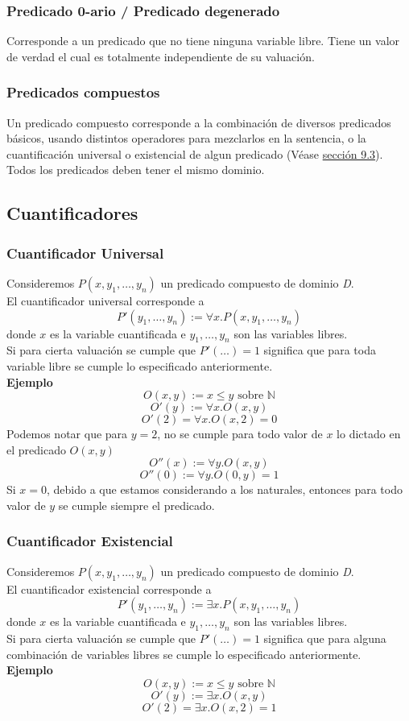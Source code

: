 \documentclass{article}
\begin{document}
\subsubsection{Predicado 0-ario / Predicado degenerado}
Corresponde a un predicado que no tiene ninguna variable libre. Tiene un valor de verdad el cual es totalmente independiente de su valuación.

\subsubsection{Predicados compuestos}
Un predicado compuesto corresponde a la combinación de diversos predicados básicos, usando distintos operadores para mezclarlos en la sentencia, o la cuantificación universal o existencial de algun predicado (Véase \hyperref[sec:cuantificadores]{sección 9.3}). Todos los predicados deben tener el mismo dominio.

\subsection{Cuantificadores}
\label{sec:cuantificadores}
\subsubsection{Cuantificador Universal}
Consideremos $P(x, y_{1}, \ldots{}, y_{n})$ un predicado compuesto de dominio \textit{D}.\\
El cuantificador universal corresponde a
$$P'(y_{1}, \ldots{}, y_{n}) := \forall{} x . P(x, y_{1}, \ldots{}, y_{n})$$
donde $x$ es la variable cuantificada e $y_{1}, \ldots{}, y_{n}$ son las variables libres.\\
Si para cierta valuación se cumple que $P'(\ldots{}) = 1$ significa que para toda variable libre se cumple lo especificado anteriormente.\\
\textbf{Ejemplo}
$$O(x,y) := x \leq y \text{ sobre } \mathds{N}$$
$$O'(y) := \forall x . O(x,y)$$
$$O'(2) = \forall x. O(x,2) = 0$$
Podemos notar que para $y = 2$, no se cumple para todo valor de $x$ lo dictado en el predicado $O(x,y)$
$$O''(x) := \forall y . O(x,y)$$
$$O''(0) := \forall y . O(0,y) = 1$$
Si $x = 0$, debido a que estamos considerando a los naturales, entonces para todo valor de $y$ se cumple siempre el predicado.

\subsubsection{Cuantificador Existencial}
Consideremos $P(x, y_{1}, \ldots{}, y_{n})$ un predicado compuesto de dominio \textit{D}.\\
El cuantificador existencial corresponde a
$$P'(y_{1}, \ldots{}, y_{n}) := \exists x . P(x, y_{1}, \ldots{}, y_{n})$$
donde $x$ es la variable cuantificada e $y_{1}, \ldots{}, y_{n}$ son las variables libres.\\
Si para cierta valuación se cumple que $P'(\ldots{}) = 1$ significa que para alguna combinación de variables libres se cumple lo especificado anteriormente.\\
\textbf{Ejemplo}
$$O(x,y) := x \leq y \text{ sobre } \mathds{N}$$
$$O'(y) := \exists x . O(x,y)$$
$$O'(2) = \exists x. O(x,2) = 1$$
\end{document}
